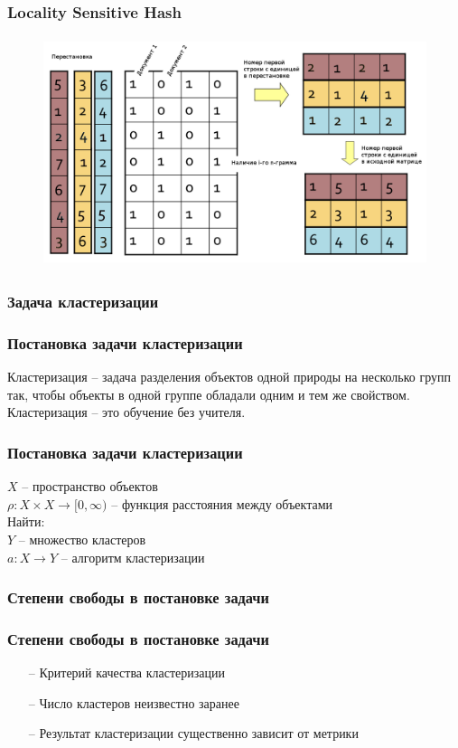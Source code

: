 \documentclass[12pt]{beamer}
\begin{document}
\begin{frame}\frametitle{Locality Sensitive Hash}
\begin{figure}[htbp]
\centering
\includegraphics[height=190pt]{images/min-hash1}  
\end{figure}
\end{frame}

\begin{frame}\frametitle{Задача кластеризации}
\end{frame}

\begin{frame}\frametitle{Постановка задачи кластеризации}
Кластеризация -- задача разделения объектов одной природы на несколько групп так, чтобы объекты в одной группе обладали одним и тем же свойством.\\
\vspace{5mm}
Кластеризация -- это обучение без учителя.
\end{frame}

\begin{frame}\frametitle{Постановка задачи кластеризации}
$X$ -- пространство объектов\\
$\rho: X \times X \rightarrow [0, \infty)$ -- функция расстояния между объектами\\
\vspace{5mm}
Найти:\\
$Y$ -- множество кластеров \\
$a: X \rightarrow Y$ -- алгоритм кластеризации
\vspace{5mm}

\end{frame}

\begin{frame}\frametitle{Степени свободы в постановке задачи}
\end{frame}

\begin{frame}\frametitle{Степени свободы в постановке задачи}
	\begin{itemize}
		\item[--] Критерий качества кластеризации
		\item[--] Число кластеров неизвестно заранее
		\item[--] Результат кластеризации существенно зависит от метрики
	\end{itemize}
\end{frame}
\end{document}
